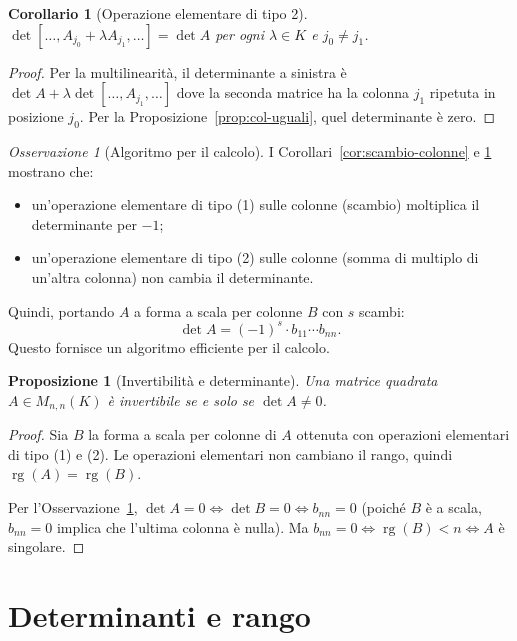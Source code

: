 \documentclass[11pt, a4paper]{book}
\theoremstyle{definition}
\theoremstyle{plain}
\newtheorem{proposizione}[definizione]{Proposizione}
\newtheorem{corollario}[definizione]{Corollario}
\theoremstyle{remark}
\newtheorem{osservazione}[definizione]{Osservazione}
\DeclareMathOperator{\rg}{rg}
\begin{document}
\begin{corollario}[Operazione elementare di tipo 2]
\label{cor:op-elem}
$\det[\ldots, A_{j_0} + \lambda A_{j_1},\ldots] = \det A$ per ogni $\lambda \in K$ e $j_0 \neq j_1$.
\end{corollario}

\begin{proof}
Per la multilinearità, il determinante a sinistra è $\det A + \lambda \det[\ldots,A_{j_1},\ldots]$ dove la seconda matrice ha la colonna $j_1$ ripetuta in posizione $j_0$. Per la Proposizione~\ref{prop:col-uguali}, quel determinante è zero.
\end{proof}

\begin{osservazione}[Algoritmo per il calcolo]
\label{oss:algoritmo-det}
I Corollari~\ref{cor:scambio-colonne} e \ref{cor:op-elem} mostrano che:
\begin{itemize}
  \item un'operazione elementare di tipo (1) sulle colonne (scambio) moltiplica il determinante per $-1$;
  \item un'operazione elementare di tipo (2) sulle colonne (somma di multiplo di un'altra colonna) non cambia il determinante.
\end{itemize}
Quindi, portando $A$ a forma a scala per colonne $B$ con $s$ scambi:
\[
  \det A = (-1)^s \cdot b_{11} \cdots b_{nn}.
\]
Questo fornisce un algoritmo efficiente per il calcolo.
\end{osservazione}

\begin{proposizione}[Invertibilità e determinante]
\label{prop:det-invertibilita}
Una matrice quadrata $A \in M_{n,n}(K)$ è invertibile se e solo se $\det A \neq 0$.
\end{proposizione}

\begin{proof}
Sia $B$ la forma a scala per colonne di $A$ ottenuta con operazioni elementari di tipo (1) e (2). Le operazioni elementari non cambiano il rango, quindi $\rg(A) = \rg(B)$.

Per l'Osservazione~\ref{oss:algoritmo-det}, $\det A = 0 \Leftrightarrow \det B = 0 \Leftrightarrow b_{nn}=0$ (poiché $B$ è a scala, $b_{nn}=0$ implica che l'ultima colonna è nulla). Ma $b_{nn}=0 \Leftrightarrow \rg(B) < n \Leftrightarrow A$ è singolare.
\end{proof}

\section{Determinanti e rango}
\label{sec:det-rango}
\end{document}
